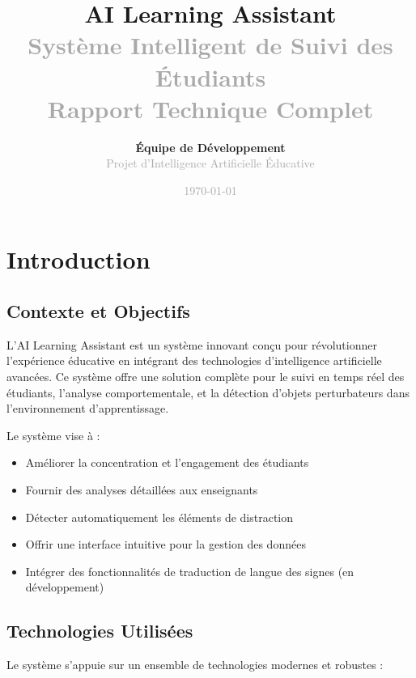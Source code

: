 \documentclass[12pt,a4paper]{article}
\title{\Huge\textbf{\textcolor{primaryblue}{AI Learning Assistant}}\\
\Large\textcolor{darkgray}{Système Intelligent de Suivi des Étudiants}\\
\large\textcolor{darkgray}{Rapport Technique Complet}}
\author{\textbf{Équipe de Développement}\\
\textcolor{darkgray}{Projet d'Intelligence Artificielle Éducative}}
\date{\textcolor{darkgray}{\today}}
\begin{document}
\maketitle
\thispagestyle{empty}

\newpage
\tableofcontents
\newpage

\section{Introduction}

\subsection{Contexte et Objectifs}

L'AI Learning Assistant est un système innovant conçu pour révolutionner l'expérience éducative en intégrant des technologies d'intelligence artificielle avancées. Ce système offre une solution complète pour le suivi en temps réel des étudiants, l'analyse comportementale, et la détection d'objets perturbateurs dans l'environnement d'apprentissage.

Le système vise à :
\begin{itemize}
    \item Améliorer la concentration et l'engagement des étudiants
    \item Fournir des analyses détaillées aux enseignants
    \item Détecter automatiquement les éléments de distraction
    \item Offrir une interface intuitive pour la gestion des données
    \item Intégrer des fonctionnalités de traduction de langue des signes (en développement)
\end{itemize}

\subsection{Technologies Utilisées}

Le système s'appuie sur un ensemble de technologies modernes et robustes :
\end{document}
